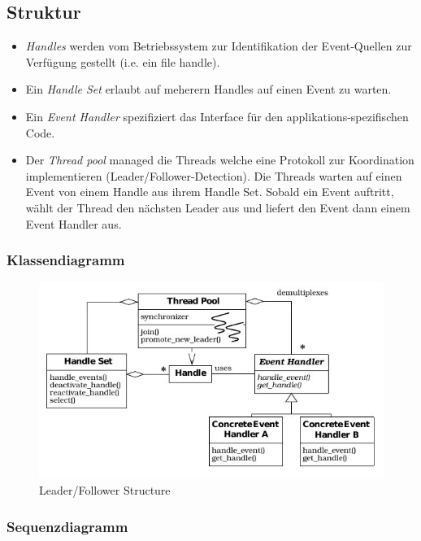 \subsection{Struktur}

\begin{itemize}
	\item \emph{Handles} werden vom Betriebssystem zur Identifikation der Event-Quellen zur Verfügung gestellt (i.e. ein file handle).
	\item Ein \emph{Handle Set} erlaubt auf meherern Handles auf einen Event zu warten.
	\item Ein \emph{Event Handler} spezifiziert das Interface für den applikations-spezifischen Code.
	\item Der \emph{Thread pool} managed die Threads welche eine Protokoll zur Koordination implementieren (Leader/Follower-Detection). Die Threads warten auf einen Event von einem Handle aus ihrem Handle Set. Sobald ein Event auftritt, wählt der Thread den nächsten Leader aus und liefert den Event dann einem Event Handler aus.
\end{itemize}

\subsubsection*{Klassendiagramm}

\begin{figure}[H]
	\centering
	\includegraphics[width=\textwidth]{content/posa2/leader-followers/images/leaderFollowerStructure.jpeg}
	\caption{Leader/Follower Structure}
\end{figure}


\subsubsection*{Sequenzdiagramm}


